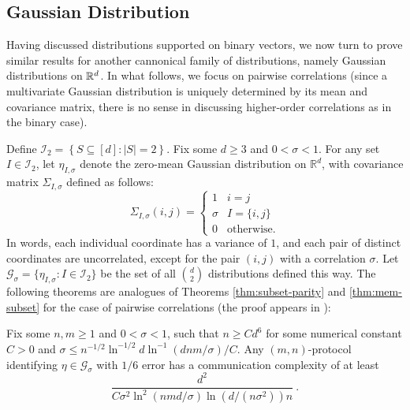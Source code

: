 
\subsection{Gaussian Distribution}\label{subsec:gaussian}

Having discussed distributions supported on binary vectors, we now turn to prove similar results for another cannonical family of distributions, namely Gaussian distributions on $\mathbb{R}^d$. In what follows, we focus on pairwise correlations (since a multivariate Gaussian distribution is uniquely determined by its mean and covariance matrix, there is no sense in discussing higher-order correlations as in the binary case). 

Define $\mathcal{I}_2 = \left\{ S \subseteq [d] \colon \lvert S \rvert = 2\right\}$.
Fix some $d \ge 3$ and $0<\sigma<1$. For any set $I \in \mathcal{I}_2$, let $\eta_{I,\sigma}$ denote the zero-mean Gaussian distribution on $\mathbb{R}^d$, with covariance matrix $\Sigma_{I,\sigma}$ defined as follows:
\[
\Sigma_{I,\sigma}(i,j) = \begin{cases}
1 & i=j \\
\sigma & I = \{i,j\} \\
0 & \text{otherwise}.
\end{cases}
\]
In words, each individual coordinate has a variance of $1$, and each pair of distinct coordinates are uncorrelated, except for the pair $(i,j)$ with a correlation $\sigma$. Let $\mathcal{G}_\sigma=\{\eta_{I,\sigma} \colon I \in \mathcal{I}_2 \}$ be the set of all $\binom{d}{2}$ distributions defined this way. The following theorems are analogues of Theorems \ref{thm:subset-parity} and \ref{thm:mem-subset} for the case of pairwise correlations (the proof appears in ):


\begin{theorem} \label{thm:normal}
Fix some $n,m \ge 1$ and $0<\sigma<1$, such that $n \ge Cd^6$ for some numerical constant $C>0$ and $\sigma \le n^{-1/2} \ln^{-1/2} d \ln^{-1}(dnm/\sigma) / C$. Any $(m,n)$-protocol identifying $\eta \in \mathcal{G}_\sigma$ with $1/6$ error has a communication complexity of at least
\[
\frac{d^2}{C \sigma^2 \ln^2 (nmd/\sigma) \ln (d /(n\sigma^2)) n }~.
\]
\end{theorem}

